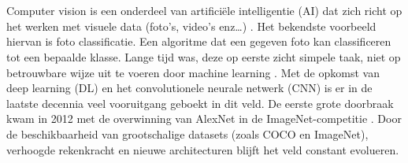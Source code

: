 \section{}%
\label{sec:computer-vision}

Computer vision is een onderdeel van artificiële intelligentie (AI) dat zich richt op het werken met visuele data (foto's, video's enz\ldots) 
\autocite{ibm2025b}. Het bekendste voorbeeld hiervan is foto classificatie. Een algoritme dat een gegeven foto kan classificeren tot een 
bepaalde klasse. Lange tijd was, deze op eerste zicht simpele taak, niet op betrouwbare wijze uit te voeren door machine learning \autocite{Geron2022}.
Met de opkomst van deep learning (DL) en het convolutionele neurale netwerk (CNN) is er in de laatste decennia veel vooruitgang geboekt
in dit veld. De eerste grote doorbraak kwam in 2012 met de overwinning van AlexNet in de ImageNet-competitie \autocite{krizhevsky2012imagenet}. 
Door de beschikbaarheid van grootschalige datasets (zoals COCO en ImageNet), verhoogde rekenkracht en nieuwe architecturen 
blijft het veld constant evolueren.



